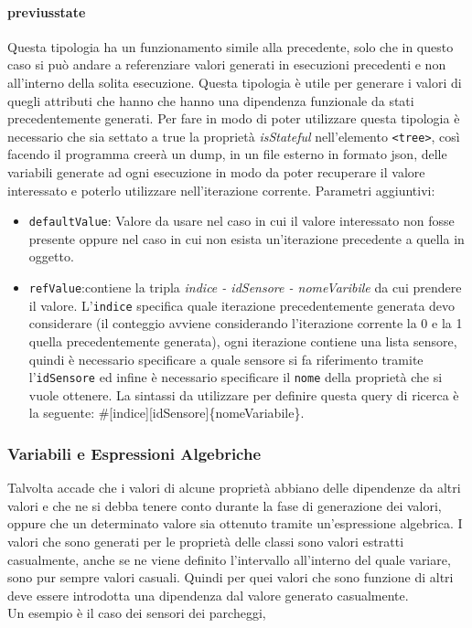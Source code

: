 \documentclass[12pt,a4paper,italian]{article}
\begin{document}
{{\paragraph{\large{previusstate}} Questa tipologia ha un funzionamento simile alla precedente, solo che in questo caso si può andare a referenziare valori generati in esecuzioni precedenti e non all'interno della solita esecuzione.
Questa tipologia è utile per generare i valori di quegli attributi che hanno che hanno una dipendenza funzionale da stati precedentemente generati. Per fare in modo di poter utilizzare questa tipologia è necessario che sia settato a true la proprietà 
\emph{isStateful} nell'elemento \texttt{<tree>}, così facendo il programma creerà un dump, in un file esterno in formato json, delle variabili generate ad ogni esecuzione in modo da poter recuperare il valore interessato e poterlo
utilizzare nell'iterazione corrente.
Parametri aggiuntivi:\\
\begin{itemize}
	\item \texttt{defaultValue}: Valore da usare nel caso in cui il valore interessato non fosse presente oppure nel caso in cui non esista un'iterazione precedente a quella in oggetto.
	\item \texttt{refValue}:contiene la tripla \emph{indice - idSensore - nomeVaribile} da cui prendere il valore. L'\texttt{indice} specifica quale iterazione precedentemente generata devo considerare (il conteggio avviene considerando l'iterazione corrente la 0 e la 1 quella precedentemente generata),
ogni iterazione contiene una lista sensore, quindi è necessario specificare a quale sensore si fa riferimento tramite l'\texttt{idSensore} ed infine è necessario specificare il \texttt{nome} della proprietà che si vuole ottenere.
La sintassi da utilizzare per definire questa query di ricerca è la seguente: \#[indice][idSensore]\{nomeVariabile\}.\\
	\end{itemize}


\subsubsection{Variabili e Espressioni Algebriche}
Talvolta accade che i valori di alcune proprietà abbiano delle dipendenze da altri valori e che ne si debba tenere conto durante la fase di generazione dei valori, oppure che un 
determinato valore sia ottenuto tramite un'espressione algebrica.
I valori che sono generati per le proprietà delle classi sono valori estratti casualmente, anche se ne viene definito l'intervallo all'interno del quale variare, sono pur sempre valori casuali. 
Quindi per quei valori che sono funzione di altri deve essere introdotta una dipendenza dal valore generato casualmente.\\
Un esempio è il caso dei sensori dei parcheggi, 

}}
\end{document}
